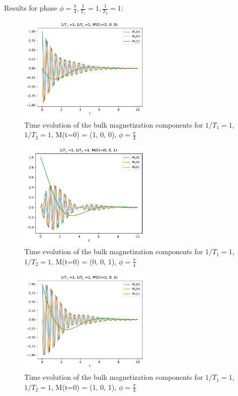 \documentclass[journal]{IEEEtran} %
\begin{document}
Results for phase $\phi = \frac{\pi}{4}, \frac{1}{T_1} = 1, \frac{1}{T_2} = 1$:
\begin{figure}[H]
\centering
\includegraphics[width=2.5in]{figs/NMR_T1-1_T2-1_Minit-100_tau_0.01_t_10_phase_pi_4.pdf}
\caption{Time evolution of the bulk magnetization components for $1/T_1 = 1$, $1/T_2 = 1$, M(t=0) = (1, 0, 0), $\phi = \frac{\pi}{4}$}
\label{f19}
\end{figure}
\begin{figure}[H]
\centering
\includegraphics[width=2.5in]{figs/NMR_T1-1_T2-1_Minit-001_tau_0.01_t_10_phase_pi_4.pdf}
\caption{Time evolution of the bulk magnetization components for $1/T_1 = 1$, $1/T_2 = 1$, M(t=0) = (0, 0, 1), $\phi = \frac{\pi}{4}$}
\label{f20}
\end{figure}
\begin{figure}[H]
\centering
\includegraphics[width=2.5in]{figs/NMR_T1-1_T2-1_Minit-101_tau_0.01_t_10_phase_pi_4.pdf}
\caption{Time evolution of the bulk magnetization components for $1/T_1 = 1$, $1/T_2 = 1$, M(t=0) = (1, 0, 1), $\phi = \frac{\pi}{4}$}
\label{f21}
\end{figure}
\end{document}
